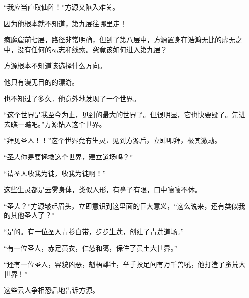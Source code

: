 \begin{this_body}
“我应当直取仙阵！”方源又陷入难关。

因为他根本就不知道，第九层往哪里走！

疯魔窟前七层，路径非常明确，但到了第八层中，方源置身在浩瀚无比的虚无之中，没有任何的标志和线索。究竟该如何进入第九层？

方源根本不知道该选择什么方向。

他只有漫无目的的漂游。

也不知过了多久，他意外地发现了一个世界。

“这个世界是我至今为止，见到的最大的世界了。但很明显，它也快要毁了。先进去瞧一瞧吧。”方源钻入这个世界。

“拜见圣人！！”这个世界竟有生灵，见到方源后，立即叩拜，极其激动。

“圣人你是要拯救这个世界，建立道场吗？”

“请圣人收我为徒，收我为徒啊！”

这些生灵都是云雾身体，类似人形，有鼻子有眼，口中嚷嚷不休。

“圣人？”方源皱起眉头，立即意识到这里面的巨大意义，“这么说来，还有类似我的其他圣人了？”

“是的。有一位圣人青衫白带，步步生莲，创建了青莲道场。”

“有一位圣人，赤足黄衣，仁慈和蔼，保住了黄土大世界。”

“还有一位圣人，容貌凶恶，魁梧雄壮，举手投足间有万千兽吼，他打造了蛮荒大世界！”

这些云人争相恐后地告诉方源。

\end{this_body}

